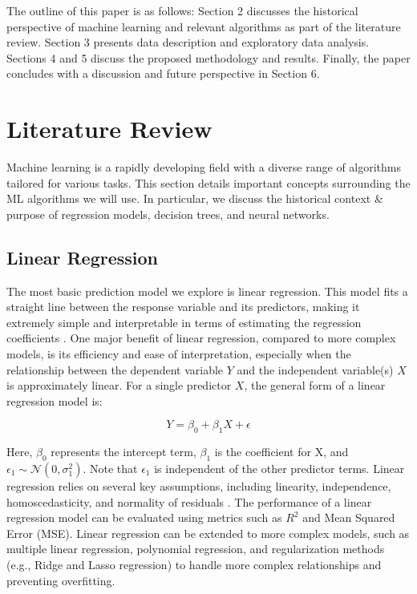 \documentclass[conference]{IEEEtran}
\begin{document}
The outline of this paper is as follows: Section 2 discusses the historical perspective of machine learning and relevant algorithms as part of the literature review. Section 3 presents data description and exploratory data analysis. Sections 4 and 5 discuss the proposed methodology and results. Finally, the paper concludes with a discussion and future perspective in Section 6.

\section{Literature Review}

Machine learning is a rapidly developing field with a diverse range of algorithms tailored for various tasks. This section details important concepts surrounding the ML algorithms we will use. In particular, we discuss the historical context \& purpose of regression models, decision trees, and neural networks.

\subsection{Linear Regression} 

The most basic prediction model we explore is linear regression. This model fits a straight line between the response variable and its predictors, making it extremely simple and interpretable in terms of estimating the regression coefficients \cite{b10}. One major benefit of linear regression, compared to more complex models, is its efficiency and ease of interpretation, especially when the relationship between the dependent variable $Y$ and the independent variable(s) $X$ is approximately linear. For a single predictor $X$, the general form of a linear regression model is:

\[
    Y = \beta_0 + \beta_1 X + \epsilon
\]

Here, $\beta_0$ represents the intercept term, $\beta_1$ is the coefficient for X, and $\epsilon_1 \sim \mathcal{N}(0,\sigma_1^2)$. Note that $\epsilon_1$ is independent of the other predictor terms. Linear regression relies on several key assumptions, including linearity, independence, homoscedasticity, and normality of residuals \cite{b8}. The performance of a linear regression model can be evaluated using metrics such as $R^2$ and Mean Squared Error (MSE). Linear regression can be extended to more complex models, such as multiple linear regression, polynomial regression, and regularization methods (e.g., Ridge and Lasso regression) to handle more complex relationships and preventing overfitting.
\end{document}
